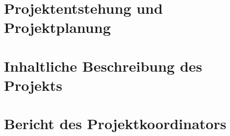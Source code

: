 \documentclass[11pt]{report}
\begin{document}


\tableofcontents

\chapter{Projektentstehung und Projektplanung}


\chapter{Inhaltliche Beschreibung des Projekts}


\chapter{Bericht des Projektkoordinators}

\end{document}
